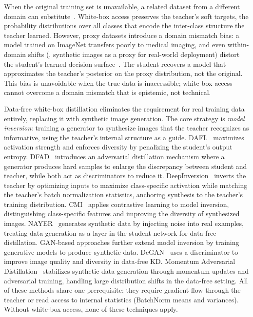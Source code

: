 \begin{foldable}
  When the original training set is unavailable, a related dataset from a different domain can substitute~\cite{chen2021learning, tang2023distribution}.
  White-box access preserves the teacher's soft targets, the probability distributions over all classes that encode the inter-class structure the teacher learned.
  However, proxy datasets introduce a domain mismatch bias: a model trained on ImageNet transfers poorly to medical imaging, and even within-domain shifts (\eg, synthetic images as a proxy for real-world deployment) distort the student's learned decision surface~\cite{torralba2011unbiased}.
  The student recovers a model that approximates the teacher's posterior on the proxy distribution, not the original.
  This bias is unavoidable when the true data is inaccessible; white-box access cannot overcome a domain mismatch that is epistemic, not technical.
\end{foldable}

\begin{foldable}
  Data-free white-box distillation eliminates the requirement for real training data entirely, replacing it with synthetic image generation.
  The core strategy is \textit{model inversion}: training a generator to synthesize images that the teacher recognizes as informative, using the teacher's internal structure as a guide.
  DAFL~\cite{chen2019data} maximizes activation strength and enforces diversity by penalizing the student's output entropy.
  DFAD~\cite{fang2019data} introduces an adversarial distillation mechanism where a generator produces hard samples to enlarge the discrepancy between student and teacher, while both act as discriminators to reduce it.
  DeepInversion~\cite{yin2020dreaming} inverts the teacher by optimizing inputs to maximize class-specific activation while matching the teacher's batch normalization statistics, anchoring synthesis to the teacher's training distribution.
  CMI~\cite{fang2021contrastive} applies contrastive learning to model inversion, distinguishing class-specific features and improving the diversity of synthesized images.
  NAYER~\cite{tran2024nayer} generates synthetic data by injecting noise into real examples, treating data generation as a layer in the student network for data-free distillation.
  GAN-based approaches further extend model inversion by training generative models to produce synthetic data.
  DeGAN~\cite{addepalli2020degan} uses a discriminator to improve image quality and diversity in data-free \ac{KD}.
  Momentum Adversarial Distillation~\cite{do2022momentum} stabilizes synthetic data generation through momentum updates and adversarial training, handling large distribution shifts in the data-free setting.
  All of these methods share one prerequisite: they require gradient flow through the teacher or read access to internal statistics (BatchNorm means and variances).
  Without white-box access, none of these techniques apply.
\end{foldable}

